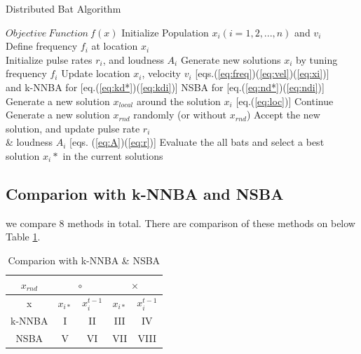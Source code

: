 \begin{algorithm}[H]
\caption{Distributed Bat Algorithm}
\label{code:sba}
\begin{algorithmic}[1]
\REQUIRE $Objective\ Function\ f(x)$
\STATE Initialize Population $x_i(i=1,2,..., n)$ and $v_i$\\
\STATE Define frequency $f_i$ at location $x_i$ \\
\STATE Initialize pulse rates $r_i$, and loudness $A_i$
\STATE Generate new solutions $x_i$ by tuning frequency $f_i$
\STATE Update location $x_i$, velocity $v_i$  [eqs.(\ref{eq:freq})(\ref{eq:vel})(\ref{eq:xi})] \\ and k-NNBA for [eq.(\ref{eq:kd*})(\ref{eq:kdi})] NSBA for [eq.(\ref{eq:nd*})(\ref{eq:ndi})] 
\STATE Generate a new solution ${x_{local}}$ around the solution $x_{i}$ [eq.(\ref{eq:loc})] 
\ELSE
\STATE Continue
\ENDIF
\STATE Generate a new solution $x_{rnd}$ randomly (or without ${x_{rnd}}$)
\STATE Accept the new solution, and update pulse rate $r_i$ \\ \& loudness $A_i$ [eqs. (\ref{eq:A})(\ref{eq:r})]  
\ENDIF
\ENDFOR
\STATE Evaluate the all bats and select a best solution $x_i*$ in the current solutions
\ENDWHILE
\end{algorithmic}
\end{algorithm}

\subsection{Comparion with k-NNBA and NSBA}
we compare 8 methods in total. There are comparison of these methods on below Table \ref{tb:compare}.  
\begin{table}[h]
\begin{center}
\caption{Comparion with k-NNBA \& NSBA}
\label{tb:compare}
\begin{tabular}{c|c|c|c|c}
\hline 
\multicolumn{1}{c|}{${x_{rnd}}$} & \multicolumn{2}{c|}{$\circ$} & \multicolumn{2}{c}{$\times$}   \\
\hline
 x & ${x_{i*}}$ & ${x_i^{t-1}}$ & ${x_{i*}}$ & ${x_i^{t-1}}$ \\
\hline 
k-NNBA & I & II & III & IV\\
NSBA & V & VI & VII & VIII\\
\hline
\end{tabular}
\end{center}
\end{table}

